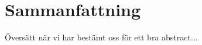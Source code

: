 



\section*{Sammanfattning}
Översätt när vi har bestämt oss för ett bra abstract...



\newpage				%
\thispagestyle{empty}
\mbox{}